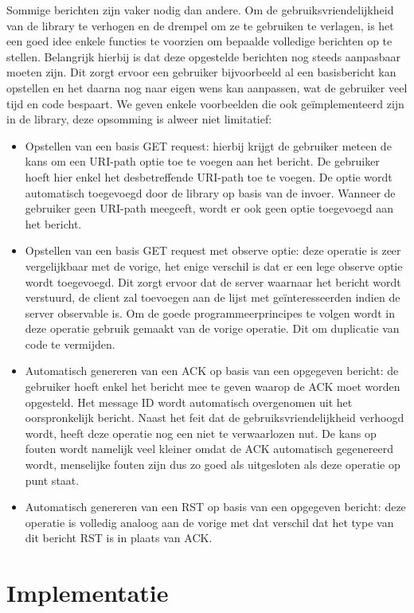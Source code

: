 Sommige berichten zijn vaker nodig dan andere. Om de gebruiksvriendelijkheid van de library te verhogen en de drempel om ze te gebruiken te verlagen, is het een goed idee enkele functies te voorzien om bepaalde volledige berichten op te stellen. Belangrijk hierbij is dat deze opgestelde berichten nog steeds aanpasbaar moeten zijn. Dit zorgt ervoor een gebruiker bijvoorbeeld al een basisbericht kan opstellen en het daarna nog naar eigen wens kan aanpassen, wat de gebruiker veel tijd en code bespaart. We geven enkele voorbeelden die ook ge\"{i}mplementeerd zijn in de library, deze opsomming is alweer niet limitatief:
\begin{itemize}
\item Opstellen van een basis GET request: hierbij krijgt de gebruiker meteen de kans om een URI-path optie toe te voegen aan het bericht. De gebruiker hoeft hier enkel het desbetreffende URI-path toe te voegen. De optie wordt automatisch toegevoegd door de library op basis van de invoer. Wanneer de gebruiker geen URI-path meegeeft, wordt er ook geen optie toegevoegd aan het bericht.
\item Opstellen van een basis GET request met observe optie: deze operatie is zeer vergelijkbaar met de vorige, het enige verschil is dat er een lege observe optie wordt toegevoegd. Dit zorgt ervoor dat de server waarnaar het bericht wordt verstuurd, de client zal toevoegen aan de lijst met ge\"{i}nteresseerden indien de server observable is. Om de goede programmeerprincipes te volgen wordt in deze operatie gebruik gemaakt van de vorige operatie. Dit om duplicatie van code te vermijden.
\item Automatisch genereren van een ACK op basis van een opgegeven bericht: de gebruiker hoeft enkel het bericht mee te geven waarop de ACK moet worden opgesteld. Het message ID wordt automatisch overgenomen uit het oorspronkelijk bericht. Naast het feit dat de gebruiksvriendelijkheid verhoogd wordt, heeft deze operatie nog een niet te verwaarlozen nut. De kans op fouten wordt namelijk veel kleiner omdat de ACK automatisch gegenereerd wordt, menselijke fouten zijn dus zo goed als uitgesloten als deze operatie op punt staat.
\item Automatisch genereren van een RST op basis van een opgegeven bericht: deze operatie is volledig analoog aan de vorige met dat verschil dat het type van dit bericht RST is in plaats van ACK.
\end{itemize}

\section{Implementatie}

